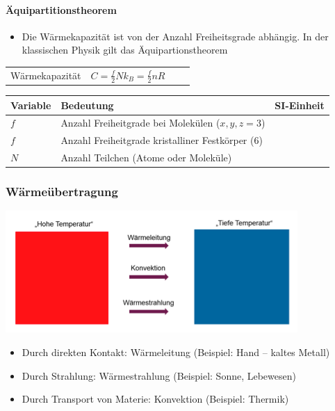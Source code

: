 \documentclass[
a4paper,
oneside,
landscape, 
8pt,
]{scrartcl}
\begin{document}
\begin{multicols*}{2}
\paragraph{Äquipartitionstheorem}
\begin{itemize}
	\item Die Wärmekapazität ist von der Anzahl Freiheitsgrade abhängig. In der klassischen Physik gilt das Äquipartionstheorem
\end{itemize}
\begin{tabbing}
	\begin{tabu} to \linewidth {l X l X}
		\toprule
		Wärmekapazität & $C = \frac{f}{2}Nk_B = \frac{f}{2}nR$  & 
		& \\
	\end{tabu}
\end{tabbing}

\begin{tabbing}
	\begin{tabu} to \linewidth {l X l}
		Variable & Bedeutung & SI-Einheit \\
		\midrule
		$f$ & Anzahl Freiheitgrade bei Molekülen ($x,y,z = 3$) &  \\
		$f$ & Anzahl Freiheitgrade kristalliner Festkörper ($6$) &  \\
		$N$ & Anzahl Teilchen (Atome oder Moleküle) & \\
		\bottomrule
	\end{tabu}
\end{tabbing}

\subsubsection{Wärmeübertragung}
\includegraphics[width=0.5\linewidth]{images/waermetausch}

\begin{itemize}
	\item Durch direkten Kontakt: Wärmeleitung (Beispiel: Hand – kaltes Metall)
	\item Durch Strahlung: Wärmestrahlung (Beispiel: Sonne, Lebewesen)
	\item Durch Transport von Materie: Konvektion (Beispiel: Thermik)
\end{itemize}


\end{multicols*}
\end{document}
